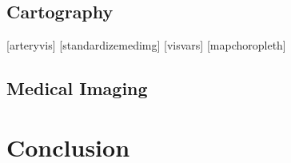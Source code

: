 \documentclass[journal]{IEEEtran}
\begin{document}
\subsection{Cartography}

[arteryvis]
[standardizemedimg]
[visvars]
[mapchoropleth]

\subsection{Medical Imaging}

\section{Conclusion}
\blindtext[1]

\ifCLASSOPTIONcaptionsoff
  \newpage
\fi




%



\end{document}
